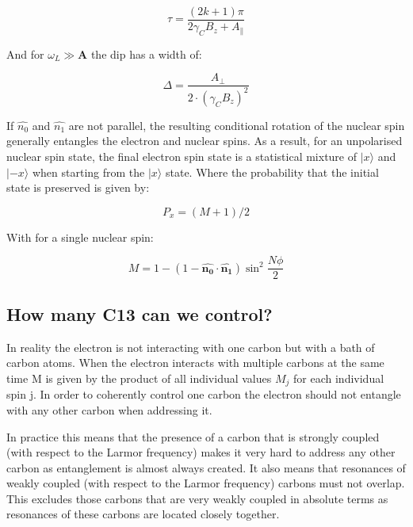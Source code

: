  \begin{equation}
\tau = \frac{(2k+1)\pi}{2 \gamma_C B_z + A_\parallel}
\label{eq:res_dip_loc}
\end{equation}

And for $\omega_L \gg \mathbf{A}$ the dip has a width of:

 \begin{equation}
\Delta = \frac{A_\perp}{2\cdot (\gamma_C B_z)^2}
\label{eq:res_dip_width}
\end{equation}

If  $\hat{n_0}$ and $\hat{n_1}$ are not parallel, the resulting conditional rotation of the nuclear spin generally entangles the electron and nuclear spins. As a result, for an unpolarised nuclear spin state, the final electron spin state is a statistical mixture of $|x\rangle$ and $|-x\rangle$ when starting from the $|x\rangle$  state. Where the probability that the initial state is preserved is given by: 


\begin{equation}
P_x = (M+1)/2 
\end{equation}

With for a single nuclear spin: 


\begin{equation}
M = 1-(1 - \hat{\mathbf{n_0}} \cdot \hat{\mathbf{n_1}}) \sin^2 \frac{N\phi}{2}
\end{equation}

\subsection{How many C13 can we control?}
\label{howmanyc13canwecontrol}

In reality the electron is not interacting with one carbon but with a bath of carbon atoms. When the electron interacts with multiple carbons at the same time M is given by the product of all individual values $M_j$ for each individual spin j. In order to coherently control one carbon the electron should not entangle with any other carbon when addressing it. 

In practice this means that the presence of a carbon that is strongly coupled (with respect to the Larmor frequency) makes it very hard to address any other carbon as entanglement is almost always created. It also means that resonances of weakly coupled (with respect to the Larmor frequency) carbons must not overlap. This excludes those carbons that are very weakly coupled in absolute terms as resonances of these carbons are located closely together.

